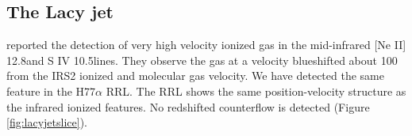 % 
% 


\subsection{The Lacy jet}
\label{sec:lacyjet}
\citet{Lacy2007a} reported the detection of very high velocity ionized gas
in the mid-infrared [Ne II] 12.8\um and S IV 10.5\um lines.  They observe the
gas at a velocity blueshifted about 100 \kms from the IRS2 ionized and molecular
gas velocity.  We have detected the same feature in the H77$\alpha$ RRL.
The RRL shows the same position-velocity structure as the infrared ionized
features.  No redshifted counterflow is detected (Figure \ref{fig:lacyjetslice}).

